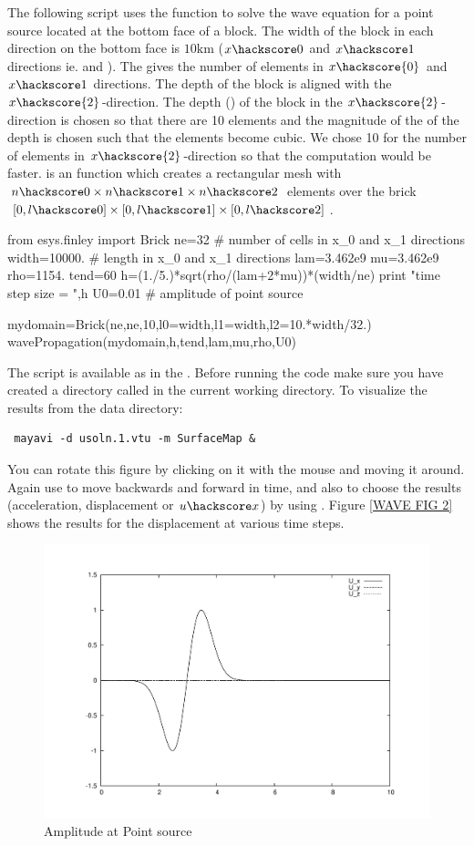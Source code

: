 The following script uses the  function to solve the
wave equation for a point source located at the bottom face of a block. The width of the block in 
each direction on the bottom face is $10\mbox{km}$ ($x\hackscore 0$ and $x\hackscore 1$ directions ie.  and ).
The  gives the number of elements in $x\hackscore{0}$ and $x\hackscore 1$ directions.  
The depth of the block is aligned with the $x\hackscore{2}$-direction. 
The depth () of the block in
the $x\hackscore{2}$-direction is chosen so that there are 10 elements and the magnitude of the
of the depth is chosen such that the elements 
become cubic. We chose 10 for the number of elements in $x\hackscore{2}$-direction so that the 
computation would be faster.  is an \finley function which creates a rectangular mesh 
with $n\hackscore 0 \times n\hackscore 1 \times n\hackscore2$ elements over the brick $[0,l\hackscore 0] \times [0,l\hackscore 1] \times [0,l\hackscore 2]$.
\begin{python}
from esys.finley import Brick
ne=32          # number of cells in x_0 and x_1 directions
width=10000.  # length in x_0 and x_1 directions
lam=3.462e9
mu=3.462e9
rho=1154.
tend=60
h=(1./5.)*sqrt(rho/(lam+2*mu))*(width/ne)
print "time step size = ",h
U0=0.01 # amplitude of point source

mydomain=Brick(ne,ne,10,l0=width,l1=width,l2=10.*width/32.)
wavePropagation(mydomain,h,tend,lam,mu,rho,U0)
\end{python}
The script is available as  in the \ExampleDirectory {}. Before running the code make sure you have created a directory called  in the current
working directory.
To visualize the results from the data directory: 
\begin{verbatim} mayavi -d usoln.1.vtu -m SurfaceMap &\end{verbatim} You can rotate this figure by clicking on it with the mouse and moving it around.
Again use  to move backwards and forward in time, and 
also to choose the results (acceleration, displacement or $u\hackscore x$) by using . Figure \ref{WAVE FIG 2} shows the results for the displacement at various time steps.

\begin{figure}[t!]
\centerline{\includegraphics[width=4.in]{figures/WavePC}}
\caption{Amplitude at Point source}
\label{WAVE FIG 1}
\end{figure}

